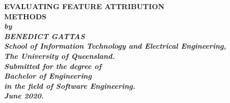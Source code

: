 \documentclass[main]{subfiles}
\begin{document}
\begin{titlepage}
\renewcommand{\baselinestretch}{1.0}
\begin{center}
\vspace*{35mm}
\Large\bf
		EVALUATING FEATURE ATTRIBUTION\\
		METHODS\\
\vspace{30mm}
\large\sl
		by\\
		BENEDICT GATTAS
		\medskip\\

\vspace{40mm}
\normalsize
		School of Information Technology and Electrical Engineering,\\
		The University of Queensland.\\
\vspace{40mm}
		Submitted for the degree of\\
		Bachelor of Engineering
		\smallskip\\
\normalsize
		in the field of Software Engineering.
		\medskip\\
\normalsize
		June 2020.		
		\medskip\\
\end{center}
\end{titlepage}
\end{document}
